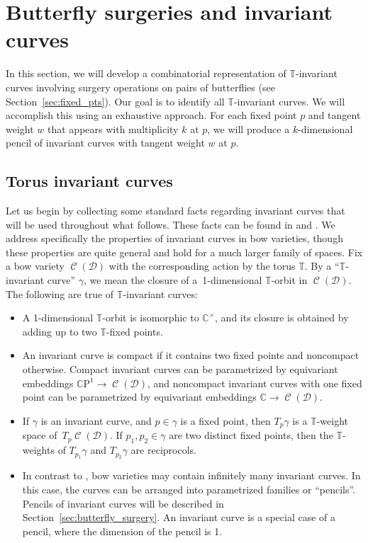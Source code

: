 \documentclass[11pt]{article}
\numberwithin{equation}{section}
\newcommand{\brane}{\mathcal D}
\newcommand{\CC}{\mathbb C}
\newcommand{\CCP}{\mathbb C \mathrm{P}}
\newcommand{\torus}{\mathbb T}
\DeclareMathOperator{\bowvar}{\mathcal C}
\begin{document}
\section{Butterfly surgeries and invariant curves} \label{sec:curves}
In this section, we will develop a combinatorial representation of $\torus$-invariant curves involving surgery operations on pairs of butterflies (see Section~\ref{sec:fixed_pts}). Our goal is to identify all $\torus$-invariant curves. We will accomplish this using an exhaustive approach. For each fixed point $p$ and tangent weight $w$ that appears with multiplicity $k$ at $p$, we will produce a $k$-dimensional pencil of invariant curves with tangent weight $w$ at $p$.


\subsection{Torus invariant curves} \label{sec:invariant_curves}
Let us begin by collecting some standard facts regarding invariant curves that will be used throughout what follows. These facts can be found in \cite[Section~7]{GKM} and \cite[Section~7.2]{equiv_coh}. We address specifically the properties of invariant curves in bow varieties, though these properties are quite general and hold for a much larger family of spaces. Fix a bow variety $\bowvar(\brane)$ with the corresponding action by the torus $\torus$. By a ``$\torus$-invariant curve'' $\gamma$, we mean the closure of a~1-dimensional $\torus$-orbit in $\bowvar(\brane)$. The following are true of $\torus$-invariant curves:
\begin{itemize}\itemsep=0pt
\item A 1-dimensional $\torus$-orbit is isomorphic to $\CC^\times$, and its closure is obtained by adding up to two $\torus$-fixed points.
\item An invariant curve is compact if it contains two fixed points and noncompact otherwise. Compact invariant curves can be parametrized by equivariant embeddings $\CCP^1 \to \bowvar(\brane)$, and noncompact invariant curves with one fixed point can be parametrized by equivariant embeddings $\CC \to \bowvar(\brane)$.
\item If $\gamma$ is an invariant curve, and $p \in \gamma$ is a fixed point, then $T_p \gamma$ is a $\torus$-weight space of~$T_p \bowvar(\brane)$. If $p_1, p_2 \in \gamma$ are two distinct fixed points, then the $\torus$-weights of $T_{p_1}\gamma$ and $T_{p_2}\gamma$ are reciprocols.
\item In contrast to \cite{GKM}, bow varieties may contain infinitely many invariant curves. In this case, the curves can be arranged into parametrized families or ``pencils''. Pencils of invariant curves will be described in Section~\ref{sec:butterfly_surgery}. An invariant curve is a special case of a pencil, where the dimension of the pencil is 1.
\end{itemize}
\end{document}
